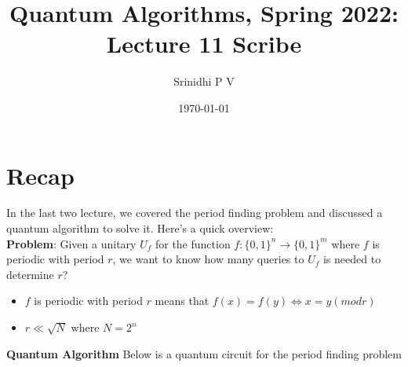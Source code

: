 \documentclass[11.5pt, paper=a4]{article}
\title{Quantum Algorithms, Spring 2022: Lecture 11 Scribe}
\author{Srinidhi P V}
\date{\today}
\theoremstyle{definition}
\numberwithin{theorem}{section}
\begin{document}
\maketitle

\section{Recap}
In the last two lecture, we covered the period finding problem and discussed a quantum algorithm to solve it. Here's a quick overview:
\\
\textbf{Problem}: Given a unitary $U_f$ for the function $f:\{0,1\}^n \rightarrow \{0,1\}^m$ where $f$ is periodic with period $r$, we want to know how many queries to $U_f$ is needed to determine $r$?
\begin{itemize}
    \item  $f$ is periodic with period $r$ means that $f(x) = f(y) \iff x = y (mod r)$
    \item $r \ll \sqrt{N}$ where $N = 2^n$
\end{itemize}
\newline
\textbf{Quantum Algorithm}
Below is a quantum circuit for the period finding problem
\end{document}
